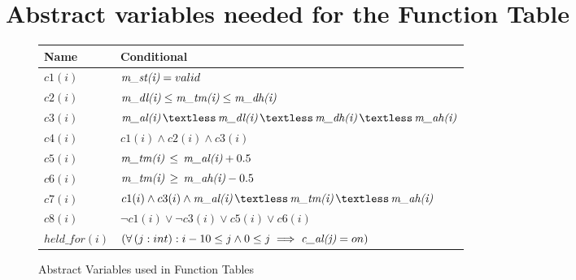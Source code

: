 \section{Abstract variables needed for the Function Table}

\begin{figure}[!htb]
\begin{center}
\begin{tabular}{|l|l|}
\hline
Name      & Conditional                                                       \\ \hline
$c1(i)$     & $\textit{m\_st(i)} = valid$                                                  \\ \hline
$c2(i)$     & $\textit{m\_dl(i)} \le \textit{m\_tm(i)} \le \textit{m\_dh(i)} $\\ \hline
$c3(i)$     & $\mv{al(i)}\,\textless\,\mv{dl(i)}\,\textless\,\mv{dh(i)}\,\textless\,\mv{ah(i)}$ \\ \hline
$c4(i)$     & $c1(i) \land c2(i) \land c3(i) $\\ \hline
$c5(i)$     & $\textit{m\_tm(i)}\,\le\,\textit{m\_al(i)} + 0.5$\\ \hline
$c6(i)$     & $\textit{m\_tm(i)}\,\ge\,\textit{m\_ah(i)} - 0.5$\\ \hline
$c7(i)$     & $c1(i) \land c3(i) \land \mv{al(i)}\,\textless\,\mv{tm(i)}\,\textless\,\mv{ah(i)}$\\ \hline
$c8(i)$     & $\neg c1(i) \lor \neg c3(i) \lor c5(i) \lor c6(i)$\\ \hline
$held\_for(i)$ & $(\forall\,(j: int): i - 10 \le j \land 0 \le j \implies \textit{c\_al(j)} = on)$\\ \hline
\end{tabular}
\caption{Abstract Variables used in Function Tables}
\label{abs-state}
\end{center}
\end{figure}